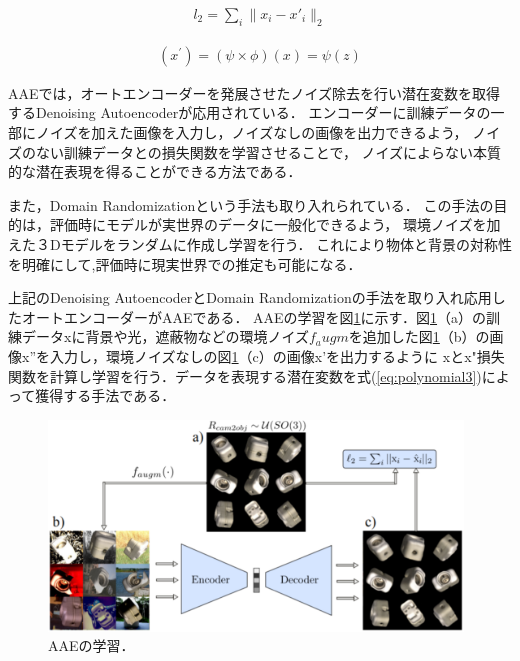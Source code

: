 \begin{eqnarray}
\label{eq:polynomial2}
l_2=  \sum_{i}\parallel{ x_i - x'_i} \parallel_2
\end{eqnarray}

\begin{eqnarray}
\label{eq:polynomial1}
( x ^ {\prime})  = (\psi \times  \phi )( x ) = \psi (z)
\end{eqnarray}



AAEでは，オートエンコーダーを発展させたノイズ除去を行い潜在変数を取得するDenoising Autoencoder\cite{DAE}が応用されている．
エンコーダーに訓練データの一部にノイズを加えた画像を入力し，ノイズなしの画像を出力できるよう，
ノイズのない訓練データとの損失関数を学習させることで，
ノイズによらない本質的な潜在表現を得ることができる方法である．

また，Domain Randomization\cite{Dm}という手法も取り入れられている．
この手法の目的は，評価時にモデルが実世界のデータに一般化できるよう，
環境ノイズを加えた３Dモデルをランダムに作成し学習を行う．
これにより物体と背景の対称性を明確にして,評価時に現実世界での推定も可能になる．

上記のDenoising AutoencoderとDomain Randomizationの手法を取り入れ応用したオートエンコーダーがAAEである．
AAEの学習を図\ref{AAEgakusyu}に示す．図\ref{AAEgakusyu}（a）の訓練データxに背景や光，遮蔽物などの環境ノイズ$f_augm$を追加した図\ref{AAEgakusyu}（b）の画像x''を入力し，環境ノイズなしの図\ref{AAEgakusyu}（c）の画像x'を出力するように
xとx"損失関数を計算し学習を行う．データを表現する潜在変数を式(\ref{eq:polynomial3})によって獲得する手法である．

      \begin{figure}[htbp]
      \begin{center}
      \includegraphics[width=110mm]{figure/eps/AAEの学習.eps}
      \caption{AAEの学習\cite{AAE}．}
      \label{AAEgakusyu}
      \end{center}
      \end{figure}

